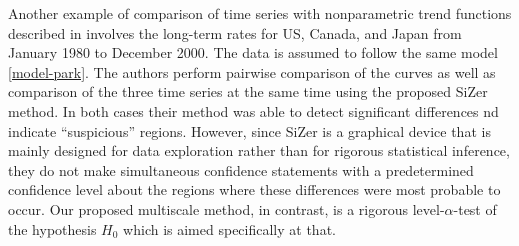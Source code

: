 \documentclass[a4paper,12pt]{article}
\begin{document}
\begin{itemize}[label=--,leftmargin=0.5cm]
\begin{example}
Another example of comparison of time series with nonparametric trend functions described in \cite{Park2009} involves the long-term rates for US, Canada, and Japan from January 1980 to December 2000. The data is assumed to follow the same model \eqref{model-park}. The authors perform pairwise comparison of the curves as well as comparison of the three time series at the same time using the proposed Si{Z}er method. In both cases their method was able to detect significant differences nd indicate ``suspicious'' regions. However, since Si{Z}er is a graphical device that is mainly designed for data exploration rather than for rigorous statistical inference, they do not make simultaneous confidence statements with a predetermined confidence level about the regions where these differences were most probable to occur. Our proposed multiscale method, in contrast, is a rigorous level-$\alpha$-test of the hypothesis $H_0$ which is aimed specifically at that.


\end{example}


\end{itemize}
\end{document}
